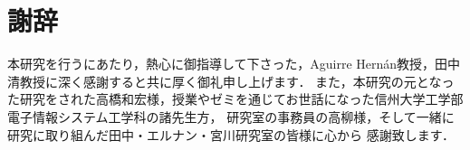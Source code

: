 \documentclass[main]{subfiles}
\begin{document}
\chapter*{謝辞}
本研究を行うにあたり，熱心に御指導して下さった，Aguirre Hern\'{a}n教授，田中清教授に深く感謝すると共に厚く御礼申し上げます．
また，本研究の元となった研究をされた高橋和宏様，授業やゼミを通じてお世話になった信州大学工学部電子情報システム工学科の諸先生方，
研究室の事務員の高柳様，そして一緒に研究に取り組んだ田中・エルナン・宮川研究室の皆様に心から
感謝致します．
\end{document}

